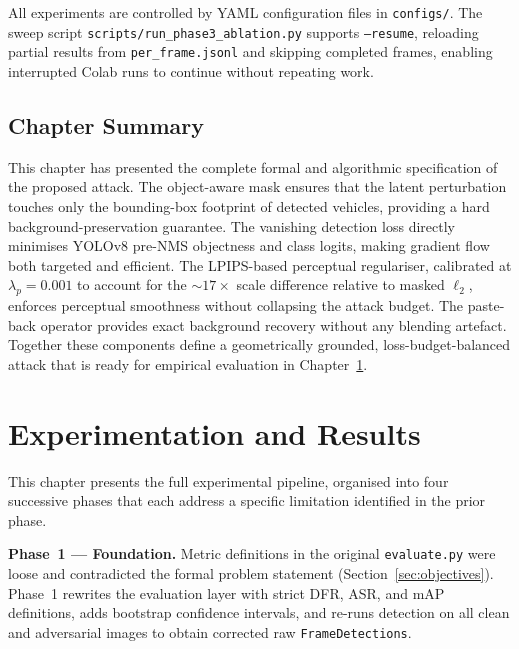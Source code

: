 \documentclass[12pt,a4paper]{report}
\begin{document}
All experiments are controlled by YAML configuration files in \texttt{configs/}.
The sweep script \texttt{scripts/run\_phase3\_ablation.py} supports
\texttt{--resume}, reloading partial results from \texttt{per\_frame.jsonl}
and skipping completed frames, enabling interrupted Colab runs to continue
without repeating work.


\section*{Chapter Summary}

This chapter has presented the complete formal and algorithmic specification
of the proposed attack. The object-aware mask ensures that the latent
perturbation touches only the bounding-box footprint of detected vehicles,
providing a hard background-preservation guarantee. The vanishing detection
loss directly minimises YOLOv8 pre-NMS objectness and class logits, making
gradient flow both targeted and efficient. The LPIPS-based perceptual
regulariser, calibrated at $\lambda_p = 0.001$ to account for the $\sim17\times$
scale difference relative to masked $\ell_2$, enforces perceptual smoothness
without collapsing the attack budget. The paste-back operator provides exact
background recovery without any blending artefact. Together these components
define a geometrically grounded, loss-budget-balanced attack that is ready
for empirical evaluation in Chapter~\ref{ch:setup}.

\chapter{Experimentation and Results}
\label{ch:setup}
\label{ch:results}
\label{ch:discussion}

This chapter presents the full experimental pipeline, organised into four
successive phases that each address a specific limitation identified in the
prior phase.

\textbf{Phase~1 — Foundation.} Metric definitions in the original
\texttt{evaluate.py} were loose and contradicted the formal problem statement
(Section~\ref{sec:objectives}). Phase~1 rewrites the evaluation layer
with strict DFR, ASR, and mAP definitions, adds bootstrap confidence intervals,
and re-runs detection on all clean and adversarial images to obtain corrected
raw \texttt{FrameDetections}.
\end{document}
